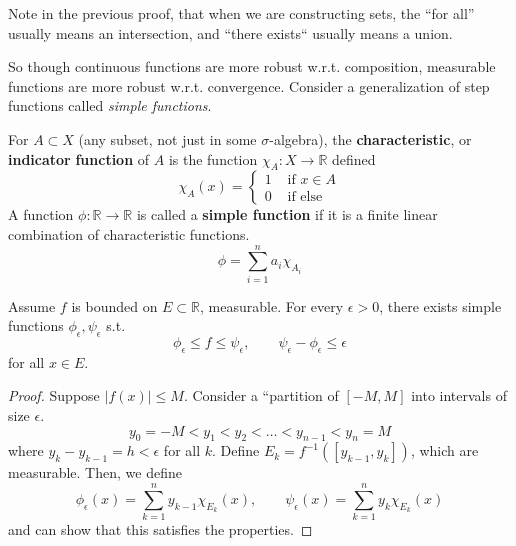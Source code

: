   Note in the previous proof, that when we are constructing sets, the ``for all'' usually means an intersection, and ``there exists`` usually means a union. 

  So though continuous functions are more robust w.r.t. composition, measurable functions are more robust w.r.t. convergence. Consider a generalization of step functions called \textit{simple functions}. 

  \begin{definition}
    For $A \subset X$ (any subset, not just in some $\sigma$-algebra), the \textbf{characteristic}, or \textbf{indicator} \textbf{function} of $A$ is the function $\chi_A : X \longrightarrow \mathbb{R}$ defined 
    \begin{equation}
      \chi_A (x) = \begin{cases} 1 & \text{ if } x \in A \\ 0 & \text{ if else} \end{cases}
    \end{equation}
    A function $\phi: \mathbb{R} \longrightarrow \mathbb{R}$ is called a \textbf{simple function} if it is a finite linear combination of characteristic functions. 
    \begin{equation}
      \phi = \sum_{i=1}^n a_i \chi_{A_i}
    \end{equation}
  \end{definition} 

  \begin{lemma}
    Assume $f$ is bounded on $E \subset \mathbb{R}$, measurable. For every $\epsilon > 0$, there exists simple functions $\phi_\epsilon, \psi_\epsilon$ s.t. 
    \begin{equation}
      \phi_\epsilon \leq f \leq \psi_\epsilon, \qquad \psi_\epsilon - \phi_\epsilon \leq \epsilon
    \end{equation}
    for all $x \in E$. 
  \end{lemma}
  \begin{proof}
    Suppose $|f(x)| \leq M$. Consider a ``partition of $[-M, M]$ into intervals of size $\epsilon$. 
    \begin{equation}
      y_0 = -M < y_1 < y_2 < \ldots < y_{n-1} < y_n = M
    \end{equation}
    where $y_k - y_{k-1} = h < \epsilon$ for all $k$. Define $E_k = f^{-1} ([y_{k-1}, y_k])$, which are measurable. Then, we define 
    \begin{equation}
      \phi_\epsilon(x) = \sum_{k=1}^n y_{k-1} \chi_{E_k} (x) , \qquad \psi_\epsilon (x) = \sum_{k=1}^n y_k \chi_{E_k} (x) 
    \end{equation}
    and can show that this satisfies the properties. 
  \end{proof}

